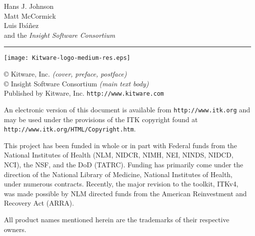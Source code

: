 \hfill
\begin{minipage}[t][6cm][b]{0.6\textwidth}
\Large
\renewcommand{\baselinestretch}{1.5}
Hans J. Johnson\\
Matt McCormick \\
Luis Ib\'{a}\~{n}ez\\
and the \emph{Insight Software Consortium}
\normalsize
\end{minipage}


\begin{minipage}[t][2cm][b]{\textwidth}
\rule{14cm}{1pt}
\end{minipage}

\newpage

\begin{minipage}[t][4cm][b]{\textwidth}
\begin{center}
\texttt{[image: Kitware-logo-medium-res.eps]}
\end{center}
\par
\begin{center}
\large

\copyright \the\year \; Kitware, Inc. \emph{(cover, preface, postface)}\\
\copyright \the\year \; Insight Software Consortium \emph{(main text body)}\\
Published by Kitware, Inc. \texttt{http://www.kitware.com}
\normalsize
\end{center}
\end{minipage}


\begin{minipage}[t][2.25cm][b]{\textwidth}
\begin{center}
An electronic version of this document is available from
\texttt{http://www.itk.org} and may be used under the provisions of the
ITK copyright found at \texttt{http://www.itk.org/HTML/Copyright.htm}.
\end{center}
\end{minipage}


\begin{minipage}[t][2.5cm][b]{\textwidth}
\begin{center}
This project has been funded in whole or in part with Federal funds from the
National Institutes of Health (NLM, NIDCR, NIMH, NEI, NINDS, NIDCD, NCI), the
NSF, and the DoD (TATRC). Funding has primarily come under the direction of the
National Library of Medicine, National Institutes of Health, under numerous
contracts. Recently, the major revision to the toolkit, ITKv4, was made
possible by NLM directed funds from the American Reinvestment and Recovery Act
(ARRA).
\end{center}
\end{minipage}


\begin{minipage}[t][1.0cm][b]{\textwidth}
\begin{center}
All product names mentioned herein are the trademarks of their respective
owners.
\end{center}
\end{minipage}
